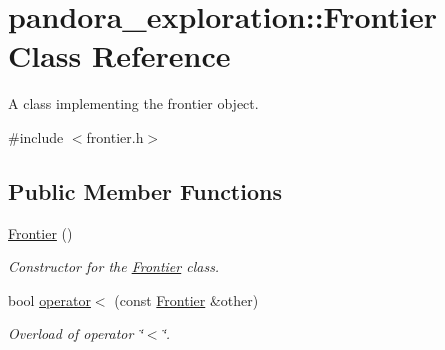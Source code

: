 \hypertarget{classpandora__exploration_1_1_frontier}{\section{pandora\-\_\-exploration\-:\-:\-Frontier \-Class \-Reference}
\label{classpandora__exploration_1_1_frontier}
}


\-A class implementing the frontier object.  




{\ttfamily \#include $<$frontier.\-h$>$}

\subsection*{\-Public \-Member \-Functions}
\begin{DoxyCompactItemize}
\item 
\hyperlink{classpandora__exploration_1_1_frontier_a879fad0c64850a8c02fbfb9465c7c220}{\-Frontier} ()
\begin{DoxyCompactList}\small\item\em \-Constructor for the \hyperlink{classpandora__exploration_1_1_frontier}{\-Frontier} class. \end{DoxyCompactList}\item 
bool \hyperlink{classpandora__exploration_1_1_frontier_afb56bc9322aa17ff374d27aa55d2fe89}{operator$<$} (const \hyperlink{classpandora__exploration_1_1_frontier}{\-Frontier} \&other)
\begin{DoxyCompactList}\small\item\em \-Overload of operator \char`\"{}$<$\char`\"{}. \end{DoxyCompactList}\end{DoxyCompactItemize}
